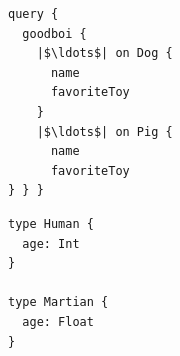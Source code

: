 
\begin{minipage}[t]{.25\textwidth}
\begin{verbatim}
query {
  goodboi {
    |$\ldots$| on Dog {
      name
      favoriteToy
    }
    |$\ldots$| on Pig {
      name
      favoriteToy
} } }
\end{verbatim}
\end{minipage}%
\begin{minipage}[t]{.25\textwidth}
\begin{verbatim}   
type Human {
  age: Int
}

type Martian {
  age: Float
}	
\end{verbatim}
\end{minipage}




